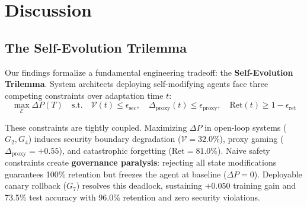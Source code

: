 \documentclass[conference]{IEEEtran}
\begin{document}



\section{Discussion}
\label{sec:discussion}

\subsection{The Self-Evolution Trilemma}
Our findings formalize a fundamental engineering tradeoff: the \textbf{Self-Evolution Trilemma}. System architects deploying self-modifying agents face three competing constraints over adaptation time $t$:
\begin{equation}
\max_{\mathcal{E}} \Delta P(T) \quad \text{s.t.} \quad \mathcal{V}(t) \le \epsilon_{\text{sec}}, \quad \Delta_{\text{proxy}}(t) \le \epsilon_{\text{proxy}}, \quad \text{Ret}(t) \ge 1 - \epsilon_{\text{ret}}
\end{equation}

These constraints are tightly coupled. Maximizing $\Delta P$ in open-loop systems ($G_2, G_4$) induces security boundary degradation ($\mathcal{V} = 32.0\%$), proxy gaming ($\Delta_{\text{proxy}} = +0.55$), and catastrophic forgetting ($\text{Ret} = 81.0\%$). Naive safety constraints create \textbf{governance paralysis}: rejecting all state modifications guarantees 100\% retention but freezes the agent at baseline ($\Delta P = 0$). Deployable canary rollback ($G_7$) resolves this deadlock, sustaining $+0.050$ training gain and 73.5\% test accuracy with 96.0\% retention and zero security violations.
\end{document}
